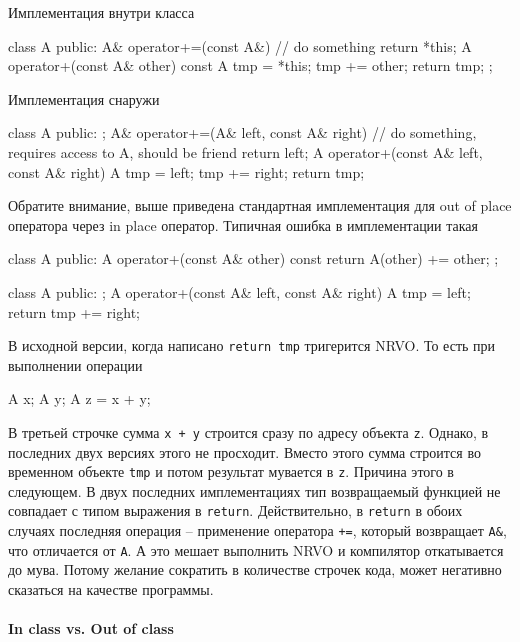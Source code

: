 Имплементация внутри класса
\begin{cppcode}
class A {
public:
  A& operator+=(const A&) {
    // do something
    return *this;
  }
  A operator+(const A& other) const {
    A tmp = *this;
    tmp += other;
    return tmp;
  }
};
\end{cppcode}
Имплементация снаружи
\begin{cppcode}
class A {
public:
};
A& operator+=(A& left, const A& right) {
  // do something, requires access to A, should be friend
  return left;
}
A operator+(const A& left, const A& right) {
  A tmp = left;
  tmp += right;
  return tmp;
}
\end{cppcode}
Обратите внимание, выше приведена стандартная имплементация для out of place оператора через in place оператор.
Типичная ошибка в имплементации такая
\begin{cppcode}
class A {
public:
  A operator+(const A& other) const {
    return A(other) += other;
  }
};

class A {
public:
};
A operator+(const A& left, const A& right) {
  A tmp = left;
  return tmp += right;
}
\end{cppcode}
В исходной версии, когда написано \verb"return tmp" тригерится NRVO.
То есть при выполнении операции
\begin{cppcode}
A x;
A y;
A z = x + y;
\end{cppcode}
В третьей строчке сумма \verb"x + y" строится сразу по адресу объекта \verb"z".
Однако, в последних двух версиях этого не просходит.
Вместо этого сумма строится во временном объекте \verb"tmp" и потом результат мувается в \verb"z".
Причина этого в следующем.
В двух последних имплементациях тип возвращаемый функцией не совпадает с типом выражения в \verb"return".
Действительно, в \verb"return" в обоих случаях последняя операция -- применение оператора \verb"+=", который возвращает \verb"A&", что отличается от \verb"A".
А это мешает выполнить NRVO и компилятор откатывается до мува.
Потому желание сократить в количестве строчек кода, может негативно сказаться на качестве программы.

\paragraph{In class vs.
Out of class}

